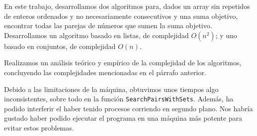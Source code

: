\documentclass[a4paper, titlepage]{article}
\begin{document}
En este trabajo, desarrollamos dos algoritmos para, dados un array sin repetidos de enteros ordenados y no necesariamente consecutivos y una suma objetivo, encontrar todas las parejas de números que sumen la suma objetivo. Desarrollamos un algoritmo basado en listas, de complejidad $O(n^2)$; y uno basado en conjuntos, de complejidad $O(n)$.

Realizamos un análisis teórico y empírico de la complejidad de los algoritmos, concluyendo las complejidades mencionadas en el párrafo anterior.

Debido a las limitaciones de la máquina, obtuvimos unos tiempos algo inconsistentes, sobre todo en la función \texttt{SearchPairsWithSets}. Además, ha podido interferir el haber tenido procesos corriendo en segundo plano. Nos habría gustado haber podido ejecutar el programa en una máquina más potente para evitar estos problemas.




\end{document}
